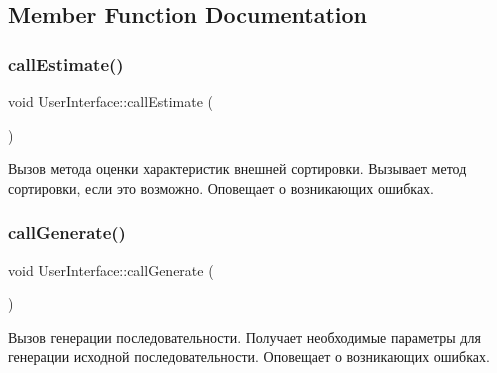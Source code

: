 \subsection{Member Function Documentation}
\hypertarget{class_user_interface_a7957201b3543ea0561d48bcc0a0d329e}{}\label{class_user_interface_a7957201b3543ea0561d48bcc0a0d329e} 
\subsubsection{\texorpdfstring{call\+Estimate()}{callEstimate()}}
{\footnotesize\ttfamily void User\+Interface\+::call\+Estimate (\begin{DoxyParamCaption}{ }\end{DoxyParamCaption})\hspace{0.3cm}{\ttfamily [private]}}



Вызов метода оценки характеристик внешней сортировки. Вызывает метод сортировки, если это возможно. Оповещает о возникающих ошибках. 

\hypertarget{class_user_interface_a27c547dadfd5588d5b734e253b2e8a4a}{}\label{class_user_interface_a27c547dadfd5588d5b734e253b2e8a4a} 
\subsubsection{\texorpdfstring{call\+Generate()}{callGenerate()}}
{\footnotesize\ttfamily void User\+Interface\+::call\+Generate (\begin{DoxyParamCaption}{ }\end{DoxyParamCaption})\hspace{0.3cm}{\ttfamily [private]}}



Вызов генерации последовательности. Получает необходимые параметры для генерации исходной последовательности. Оповещает о возникающих ошибках. 

\hypertarget{class_user_interface_a332db63dca89d684f7e9e1272f4c3745}{}\label{class_user_interface_a332db63dca89d684f7e9e1272f4c3745} 

